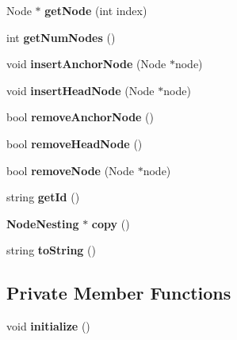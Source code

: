 \begin{CompactItemize}
\item 
Node $\ast$ \textbf{getNode} (int index)\label{classbr_1_1pucrio_1_1telemidia_1_1ginga_1_1ncl_1_1model_1_1components_1_1NodeNesting_81cda37cc4fefe01b5f34217430866c3}

\item 
int \textbf{getNumNodes} ()\label{classbr_1_1pucrio_1_1telemidia_1_1ginga_1_1ncl_1_1model_1_1components_1_1NodeNesting_52ab76ba6f0a40a06c6fc4043351824e}

\item 
void \textbf{insertAnchorNode} (Node $\ast$node)\label{classbr_1_1pucrio_1_1telemidia_1_1ginga_1_1ncl_1_1model_1_1components_1_1NodeNesting_542f86bc254c60f5036e431b05e22021}

\item 
void \textbf{insertHeadNode} (Node $\ast$node)\label{classbr_1_1pucrio_1_1telemidia_1_1ginga_1_1ncl_1_1model_1_1components_1_1NodeNesting_9bb9df599bc992755cb198495d7d4b18}

\item 
bool \textbf{removeAnchorNode} ()\label{classbr_1_1pucrio_1_1telemidia_1_1ginga_1_1ncl_1_1model_1_1components_1_1NodeNesting_ffdc008c04ef3bc96ca836f0e80ef06f}

\item 
bool \textbf{removeHeadNode} ()\label{classbr_1_1pucrio_1_1telemidia_1_1ginga_1_1ncl_1_1model_1_1components_1_1NodeNesting_990af870934f0ed5b84389680b8a9a12}

\item 
bool \textbf{removeNode} (Node $\ast$node)\label{classbr_1_1pucrio_1_1telemidia_1_1ginga_1_1ncl_1_1model_1_1components_1_1NodeNesting_40e88a9a5971936f048810deb2a4d4f4}

\item 
string \textbf{getId} ()\label{classbr_1_1pucrio_1_1telemidia_1_1ginga_1_1ncl_1_1model_1_1components_1_1NodeNesting_bba5652b12c4d6161f860eb44d5789d8}

\item 
{\bf NodeNesting} $\ast$ \textbf{copy} ()\label{classbr_1_1pucrio_1_1telemidia_1_1ginga_1_1ncl_1_1model_1_1components_1_1NodeNesting_e66bad19361e8cdec4f17b0229d12e39}

\item 
string \textbf{toString} ()\label{classbr_1_1pucrio_1_1telemidia_1_1ginga_1_1ncl_1_1model_1_1components_1_1NodeNesting_2a35b0d68ef09ad99a22fa8563e1797f}

\end{CompactItemize}
\subsection*{Private Member Functions}
\begin{CompactItemize}
\item 
void \textbf{initialize} ()\label{classbr_1_1pucrio_1_1telemidia_1_1ginga_1_1ncl_1_1model_1_1components_1_1NodeNesting_25a40b6614565f755233080a384c35f1}

\end{CompactItemize}
